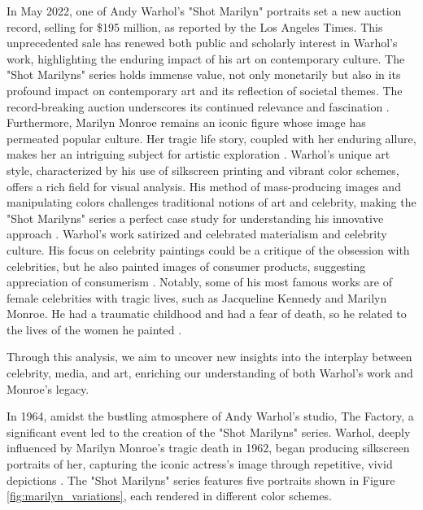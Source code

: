 \documentclass{article}
\begin{document}
In May 2022, one of Andy Warhol's "Shot Marilyn" portraits set a new
auction record, selling for \$195 million, as reported by the Los Angeles Times. This unprecedented sale has renewed both public and
scholarly interest in Warhol's work, highlighting the enduring impact of
his art on contemporary culture. The "Shot Marilyns" series holds
immense value, not only monetarily but also in its profound impact on
contemporary art and its reflection of societal themes. The
record-breaking auction underscores its continued relevance and
fascination \citep{vankin_2022_sold}. Furthermore, Marilyn Monroe remains an iconic
figure whose image has permeated popular culture. Her tragic life story,
coupled with her enduring allure, makes her an intriguing subject for
artistic exploration \citep{masterworksfineartgallery_2019_andy}. Warhol's unique art style,
characterized by his use of silkscreen printing and vibrant color
schemes, offers a rich field for visual analysis. His method of
mass-producing images and manipulating colors challenges traditional
notions of art and celebrity, making the "Shot Marilyns" series a
perfect case study for understanding his innovative approach \citep{lanchner_2008_andy}. Warhol's work satirized and celebrated materialism and celebrity culture. His focus on celebrity paintings could be a critique of the obsession with celebrities, but he also painted images of consumer products, suggesting appreciation of consumerism \citep{biography_2022}. Notably, some of his most famous works are of female celebrities with tragic lives, such as Jacqueline Kennedy and Marilyn Monroe. He had a traumatic childhood and had a fear of death, so he related to the lives of the women he painted \citep{fallon_2010_andy}.

Through this analysis, we aim to uncover new insights
into the interplay between celebrity, media, and art, enriching our understanding of both Warhol's work and Monroe's legacy.

In 1964, amidst the bustling atmosphere of Andy Warhol's studio, The Factory, a significant event led to the creation of the "Shot Marilyns" series. Warhol, deeply influenced by Marilyn Monroe's tragic death in 1962, began producing silkscreen portraits of her, capturing the iconic actress's image through repetitive, vivid depictions \citep{christies_2022_andy}. The "Shot Marilyns" series features five portraits shown in Figure \ref{fig:marilyn_variations}, each rendered in different
color schemes.
\end{document}
